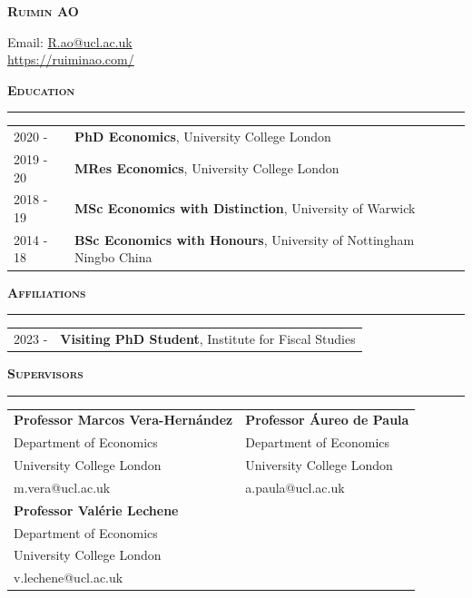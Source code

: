 \documentclass[11pt]{article}
\begin{document}
\noindent

\noindent\LARGE{\textsc{\textbf{Ruimin AO}}} \\
\vspace{0.2em}
\normalsize

\noindent Email: \href{mailto:R.ao@ucl.ac.uk}{R.ao@ucl.ac.uk}\\
\noindent \href{https://ruiminao.com/}{https://ruiminao.com/}
\vspace{1em}
\linespread{1.2}

\noindent\large{\textbf{\textsc{Education}}}
\vspace{0.2em}
\hrule
\normalsize
\noindent \begin{tabular}{ p{2cm} p{13.6cm}}
2020 -  & \textbf{PhD Economics}, University College London \\
2019 - 20 & \textbf{MRes Economics}, University College London \\
2018 - 19 & \textbf{MSc Economics with Distinction}, University of Warwick \\
2014 - 18 & \textbf{BSc Economics with Honours}, University of Nottingham Ningbo China \\
\end{tabular}
\vspace{0.6em}

\noindent\large{\textbf{\textsc{Affiliations}}}
\vspace{0.2em}
\hrule
\normalsize
\noindent \begin{tabular}{ p{2cm} p{13.6cm}}
2023 -  & \textbf{Visiting PhD Student}, Institute for Fiscal Studies 
\end{tabular}
\vspace{0.6em}

\noindent\large{\textbf{\textsc{Supervisors}}}
\vspace{0.2em}
\hrule
\normalsize
\noindent \begin{tabular}{ p{8.5cm} p{7cm}}
\textbf{Professor Marcos Vera-Hern\'andez}      & \textbf{Professor \'Aureo de Paula} \\
Department of Economics                         & Department of Economics     \\
University College London                       & University College London   \\
m.vera@ucl.ac.uk                                & a.paula@ucl.ac.uk           \\[0.6em]
\textbf{Professor Val\'erie Lechene}            &  \\
Department of Economics                         &   \\
University College London                       &   \\
v.lechene@ucl.ac.uk                             &
\end{tabular}
\vspace{0.6em}
\end{document}

